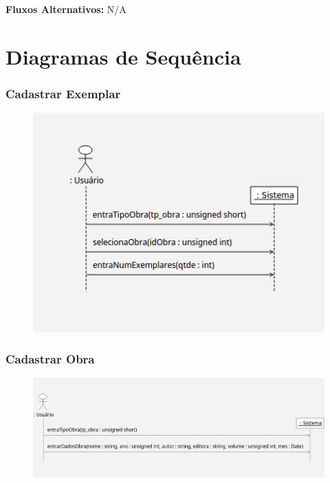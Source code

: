 \documentclass[
	12pt,				%
	openright,			%
	oneside,			%
	a4paper,			%
	english,			%
	brazil				%
	]{abntex2}
\begin{document}
\textbf{Fluxos Alternativos:} N/A

\chapter{Diagramas de Sequência}

\subsection{Cadastrar Exemplar}

\begin{figure}[H]
\includegraphics[width=1\textwidth]{DSSCadastrarExemplar}
\label{fig:figura2}
\end{figure}

\subsection{Cadastrar Obra}

\begin{figure}[H]
\includegraphics[width=1\textwidth]{DSSCadastrarObra}
\label{fig:figura3}
\end{figure}
\end{document}
